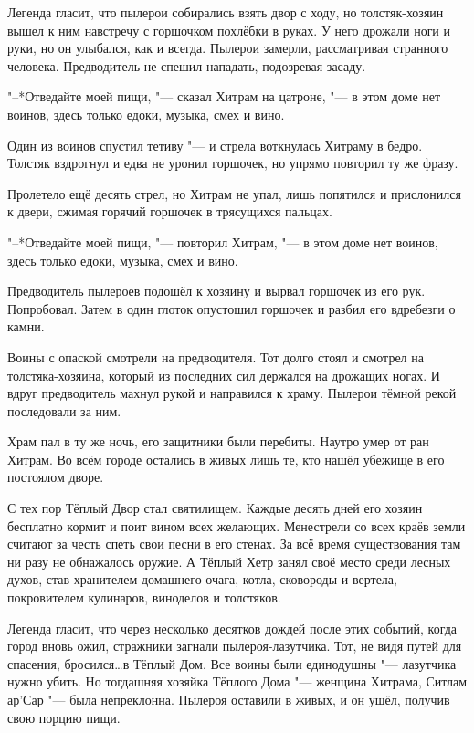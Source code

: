 \documentclass[a4paper,10pt]{book}
\begin{document}
Легенда гласит, что пылерои собирались взять двор с ходу, но толстяк-хозяин 
вышел к ним навстречу с горшочком похлёбки в руках. У него дрожали ноги и руки, 
но он улыбался, как и всегда. Пылерои замерли, рассматривая странного человека. 
Предводитель не спешил нападать, подозревая засаду.

"--*Отведайте моей пищи, "--- сказал Хитрам на цатроне, "--- в этом доме нет 
воинов, здесь только едоки, музыка, смех и вино.

Один из воинов спустил тетиву "--- и стрела воткнулась Хитраму в бедро. Толстяк 
вздрогнул и едва не уронил горшочек, но упрямо повторил ту же фразу.

Пролетело ещё десять стрел, но Хитрам не упал, лишь попятился и прислонился к 
двери, сжимая горячий горшочек в трясущихся пальцах.

"--*Отведайте моей пищи, "--- повторил Хитрам, "--- в этом доме нет воинов, 
здесь 
только едоки, музыка, смех и вино.

Предводитель пылероев подошёл к хозяину и вырвал горшочек из его рук. 
Попробовал. Затем в один глоток опустошил горшочек и разбил его вдребезги о 
камни.

Воины с опаской смотрели на предводителя. Тот долго стоял и смотрел на 
толстяка-хозяина, который из последних сил держался на дрожащих ногах. И вдруг 
предводитель махнул рукой и направился к храму. Пылерои тёмной рекой 
последовали за ним.

Храм пал в ту же ночь, его защитники были перебиты. Наутро умер от ран Хитрам. 
Во всём городе остались в живых лишь те, кто нашёл убежище в его постоялом 
дворе.

С тех пор Тёплый Двор стал святилищем. Каждые десять дней его хозяин бесплатно 
кормит и поит вином всех желающих. Менестрели со всех краёв земли считают за 
честь спеть свои песни в его стенах. За всё время существования там ни разу не 
обнажалось оружие. А Тёплый Хетр занял своё место среди лесных духов, став 
хранителем домашнего очага, котла, сковороды и вертела, покровителем кулинаров, 
виноделов и толстяков.

Легенда гласит, что через несколько десятков дождей после этих событий, когда 
город вновь ожил, стражники загнали пылероя-лазутчика. Тот, не видя путей для 
спасения, бросился\dots в Тёплый Дом. Все воины были единодушны "--- лазутчика 
нужно убить. Но тогдашняя хозяйка Тёплого Дома "--- женщина Хитрама, Ситлам 
ар’Сар 
"--- была непреклонна. Пылероя оставили в живых, и он ушёл, получив свою порцию 
пищи.
\end{document}
